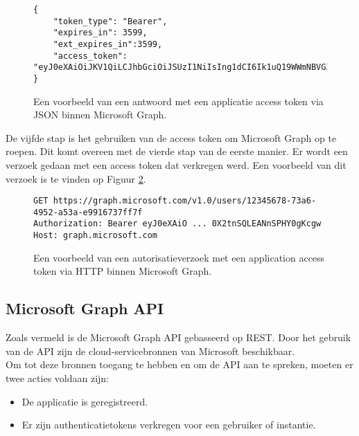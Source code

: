 \begin{figure}[!h]
    \scriptsize
    \begin{verbatim}
{
    "token_type": "Bearer",
    "expires_in": 3599,
    "ext_expires_in":3599,
    "access_token": "eyJ0eXAiOiJKV1QiLCJhbGciOiJSUzI1NiIsIng1dCI6Ik1uQ19WWmNBVGZNNXBP..."
} 
    \end{verbatim}    
    \caption[Voorbeeld Application Token Response Microsoft Graph]{Een voorbeeld van een antwoord met een applicatie access token via \ac{JSON} binnen Microsoft Graph.}
    \label{MSGATRRES}
\end{figure}

De vijfde stap is het gebruiken van de access token om Microsoft Graph op te roepen. Dit komt overeen met de vierde stap van de eerste manier. Er wordt een verzoek gedaan met een access token dat verkregen werd. Een voorbeeld van dit verzoek is te vinden op Figuur \ref{MSGAAT}.

\begin{figure}[!h]
    \scriptsize
    \begin{verbatim}
GET https://graph.microsoft.com/v1.0/users/12345678-73a6-4952-a53a-e9916737ff7f
Authorization: Bearer eyJ0eXAiO ... 0X2tnSQLEANnSPHY0gKcgw
Host: graph.microsoft.com
    \end{verbatim}    
    \caption[Voorbeeld Application autorisatieverzoek Microsoft Graph]{Een voorbeeld van een autorisatieverzoek met een application access token via \ac{HTTP} binnen Microsoft Graph.}
    \label{MSGAAT}
\end{figure}



\subsection{Microsoft Graph API}

Zoals vermeld is de Microsoft Graph \Ac{API} gebasseerd op \Ac{REST}. Door het gebruik van de \ac{API} zijn de cloud-servicebronnen van Microsoft beschikbaar. \\

Om tot deze bronnen toegang te hebben en om de \Ac{API} aan te spreken, moeten er twee acties voldaan zijn:

\begin{itemize}
    \item De applicatie is geregistreerd.
    \item Er zijn authenticatietokens verkregen voor een gebruiker of instantie.
\end{itemize}


